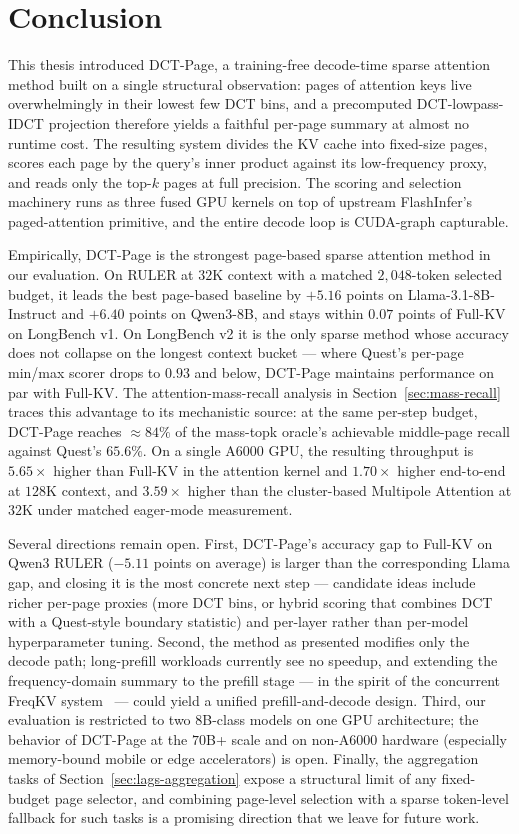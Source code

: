 \chapter{Conclusion}\label{chap:conclusion}

This thesis introduced DCT-Page, a training-free decode-time sparse
attention method built on a single structural observation: pages of
attention keys live overwhelmingly in their lowest few DCT bins, and
a precomputed DCT-lowpass-IDCT projection therefore yields a faithful
per-page summary at almost no runtime cost.  The resulting system
divides the KV cache into fixed-size pages, scores each page by the
query's inner product against its low-frequency proxy, and reads only
the top-$k$ pages at full precision.  The scoring and selection
machinery runs as three fused GPU kernels on top of upstream
FlashInfer's paged-attention primitive, and the entire decode loop is
CUDA-graph capturable.

Empirically, DCT-Page is the strongest page-based sparse attention
method in our evaluation.  On RULER at $32$K context with a matched
$2{,}048$-token selected budget, it leads the best page-based
baseline by $+5.16$ points on Llama-3.1-8B-Instruct and $+6.40$ points
on Qwen3-8B, and stays within $0.07$ points of Full-KV on LongBench
v1.  On LongBench v2 it is the only sparse method whose accuracy does
not collapse on the longest context bucket --- where Quest's per-page
min/max scorer drops to $0.93$ and below, DCT-Page maintains
performance on par with Full-KV.  The attention-mass-recall analysis
in Section~\ref{sec:mass-recall} traces this advantage to its
mechanistic source: at the same per-step budget, DCT-Page reaches
$\approx 84\%$ of the mass-topk oracle's achievable middle-page
recall against Quest's $65.6\%$.  On a
single A6000 GPU, the resulting throughput is $5.65 \times$ higher
than Full-KV in the attention kernel and $1.70 \times$ higher
end-to-end at $128$K context, and $3.59 \times$ higher than the
cluster-based Multipole Attention at $32$K under matched eager-mode
measurement.

Several directions remain open.  First, DCT-Page's accuracy gap to
Full-KV on Qwen3 RULER ($-5.11$ points on average) is larger than the
corresponding Llama gap, and closing it is the most concrete next
step --- candidate ideas include richer per-page proxies (more DCT
bins, or hybrid scoring that combines DCT with a Quest-style
boundary statistic) and per-layer rather than per-model
hyperparameter tuning.  Second, the method as presented modifies only
the decode path; long-prefill workloads currently see no speedup, and
extending the frequency-domain summary to the prefill stage --- in
the spirit of the concurrent FreqKV system~\cite{kai2026freqkv} ---
could yield a unified prefill-and-decode design.  Third, our
evaluation is restricted to two $8$B-class models on one GPU
architecture; the behavior of DCT-Page at the $70$B+ scale and on
non-A6000 hardware (especially memory-bound mobile or edge
accelerators) is open.  Finally, the aggregation tasks of
Section~\ref{sec:lags-aggregation} expose a structural limit of any
fixed-budget page selector, and combining page-level selection with a
sparse token-level fallback for such tasks is a promising direction
that we leave for future work.

